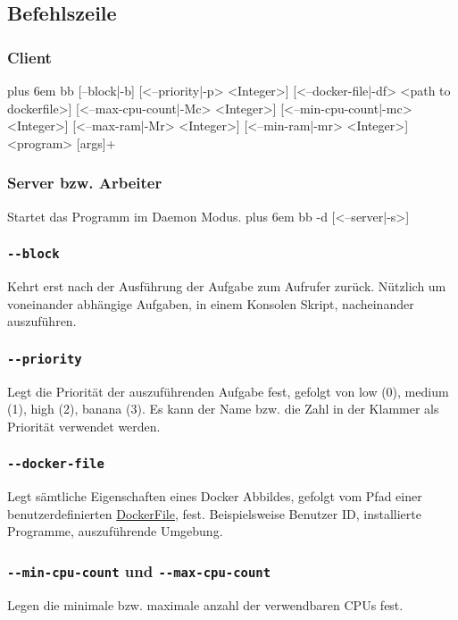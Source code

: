 \documentclass[a4paper,12pt]{article}
\makeatletter
\newenvironment{mycode}
 {\def\@xobeysp{\ }\verbatim\rightskip=0pt plus 6em\relax}
 {\endverbatim}
\makeatother
\begin{document}
\subsection{Befehlszeile}
\subsubsection{Client}
\begin{mycode}
bb [--block|-b] [<--priority|-p> <Integer>] [<--docker-file|-df> <path to dockerfile>] [<--max-cpu-count|-Mc> <Integer>] [<--min-cpu-count|-mc> <Integer>] [<--max-ram|-Mr> <Integer>] [<--min-ram|-mr> <Integer>] <program> [args]+
\end{mycode}

\subsubsection{Server bzw. Arbeiter}
Startet das Programm im \gls{Daemon} Modus.
\begin{mycode}
bb -d [<--server|-s>]
\end{mycode}

\subsubsection{\texttt{-{}-block}}
Kehrt erst nach der Ausführung der Aufgabe zum Aufrufer zurück. Nützlich um voneinander abhängige Aufgaben, in einem Konsolen Skript, nacheinander auszuführen.

\subsubsection{\texttt{-{}-priority}}
Legt die Priorität der auszuführenden Aufgabe fest, gefolgt von low (0), medium (1), high (2), banana (3).
Es kann der Name bzw. die Zahl in der Klammer als Priorität verwendet werden.

\subsubsection{\texttt{-{}-docker-file}}
Legt sämtliche Eigenschaften eines Docker Abbildes, gefolgt vom Pfad einer benutzerdefinierten \href{https://docs.docker.com/engine/reference/builder/}{DockerFile}, fest.
Beispielsweise Benutzer ID, installierte Programme, auszuführende Umgebung.

\subsubsection{\texttt{-{}-min-cpu-count} und \texttt{-{}-max-cpu-count}}
Legen die minimale bzw. maximale anzahl der verwendbaren \glspl{CPU} fest.
\end{document}
